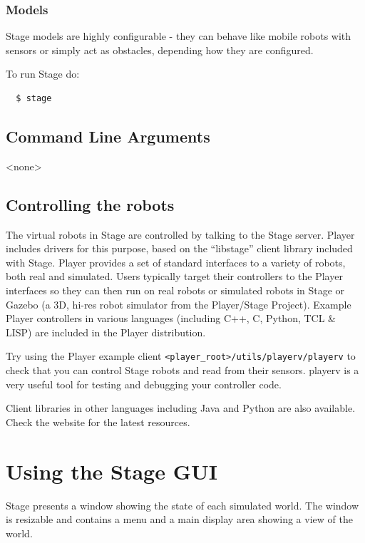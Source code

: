 \documentclass[letter,11pt,twoside]{report}
\begin{document}
\subsection{Models}

 Stage
models are highly configurable - they can behave like mobile robots
with sensors or simply act as obstacles, depending how they are
configured.




 To run Stage do:
 \begin{verbatim} 
  $ stage
 \end{verbatim} 

\section{Command Line Arguments}

<none>

\section{Controlling the robots}

The virtual robots in Stage are controlled by talking to the Stage
server. Player includes drivers for this purpose, based on the
``libstage'' client library included with Stage. Player provides a set
of standard interfaces to a variety of robots, both real and
simulated. Users typically target their controllers to the Player
interfaces so they can then run on real robots or simulated robots in
Stage or Gazebo (a 3D, hi-res robot simulator from the Player/Stage
Project). Example Player controllers in various languages (including C++,
C, Python, TCL \& LISP) are included in the Player distribution.

Try using the Player example client
\verb+<player_root>/utils/playerv/playerv+ to check that you can control
Stage robots and read from their sensors. playerv is a very useful
tool for testing and debugging your controller code.

Client libraries in other languages including Java and Python are also
available. Check the website for the latest resources.

\chapter{Using the Stage GUI}

Stage presents a window showing the state of each simulated world. The
window is resizable and contains a menu and a main display area
showing a view of the world.
\end{document}
